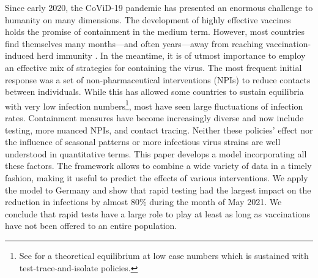 Since early 2020, the CoViD-19 pandemic has presented an enormous challenge to humanity
on many dimensions. The development of highly effective vaccines holds the promise of
containment in the medium term. However, most countries find themselves many
months---and often years---away from reaching vaccination-induced herd immunity
\citep{Swaminathan2021}. In the meantime, it is of utmost importance to employ an effective mix
of strategies for containing the virus. The most frequent initial response was a set of
non-pharmaceutical interventions (NPIs) to reduce contacts between individuals. While
this has allowed some countries to sustain equilibria with very low infection
numbers\footnote{See \citet{Contreras2021} for a theoretical equilibrium at low case
numbers which is sustained with test-trace-and-isolate policies.}, most have seen large
fluctuations of infection rates. Containment measures have become increasingly diverse
and now include testing, more nuanced NPIs, and contact tracing. Neither these policies'
effect nor the influence of seasonal patterns or more infectious virus strains are well
understood in quantitative terms. This paper develops a model incorporating all these
factors. The framework allows to combine a wide variety of data in a timely fashion,
making it useful to predict the effects of various interventions. We apply the model to
Germany and show that rapid testing had the largest impact on the reduction in
infections by almost 80\% during the month of May 2021. We conclude that rapid tests
have a large role to play at least as long as vaccinations have not been offered to an
entire population.

